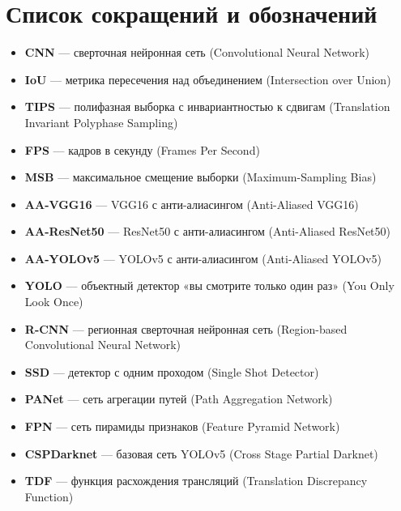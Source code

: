 \section*{Список сокращений и обозначений}

\begin{itemize}
    \item \textbf{CNN} --- сверточная нейронная сеть (Convolutional Neural Network)
    \item \textbf{IoU} --- метрика пересечения над объединением (Intersection over Union)
    \item \textbf{TIPS} --- полифазная выборка с инвариантностью к сдвигам (Translation Invariant Polyphase Sampling)
    \item \textbf{FPS} --- кадров в секунду (Frames Per Second)
    \item \textbf{MSB} --- максимальное смещение выборки (Maximum-Sampling Bias)
    \item \textbf{AA-VGG16} --- VGG16 с анти-алиасингом (Anti-Aliased VGG16)
    \item \textbf{AA-ResNet50} --- ResNet50 с анти-алиасингом (Anti-Aliased ResNet50)
    \item \textbf{AA-YOLOv5} --- YOLOv5 с анти-алиасингом (Anti-Aliased YOLOv5)
    \item \textbf{YOLO} --- объектный детектор «вы смотрите только один раз» (You Only Look Once)
    \item \textbf{R-CNN} --- регионная сверточная нейронная сеть (Region-based Convolutional Neural Network)
    \item \textbf{SSD} --- детектор с одним проходом (Single Shot Detector)
    \item \textbf{PANet} --- сеть агрегации путей (Path Aggregation Network)
    \item \textbf{FPN} --- сеть пирамиды признаков (Feature Pyramid Network)
    \item \textbf{CSPDarknet} --- базовая сеть YOLOv5 (Cross Stage Partial Darknet)
    \item \textbf{TDF} --- функция расхождения трансляций (Translation Discrepancy Function)
\end{itemize}

\newpage 